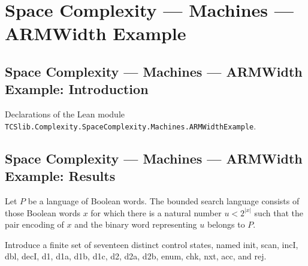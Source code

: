 \section{Space Complexity --- Machines --- ARMWidth Example}
\subsection*{Space Complexity --- Machines --- ARMWidth Example: Introduction}

Declarations of the Lean module \texttt{TCSlib.Complexity.SpaceComplexity.Machines.ARMWidthExample}.

\subsection*{Space Complexity --- Machines --- ARMWidth Example: Results}

\begin{definition}
\label{Complexity.LogProg.WidthExample.searchLang}
\leanok
{}
Let $P$ be a language of Boolean words. The bounded search language consists of those
Boolean words $x$ for which there is a natural number $u<2^{|x|}$ such that the pair
encoding of $x$ and the binary word representing $u$ belongs to $P$.
\end{definition}

\begin{definition}
\label{Complexity.LogProg.WidthExample.Lb}
\leanok
Introduce a finite set of seventeen distinct control states, named init, scan, incI,
dbl, decI, d1, d1a, d1b, d1c, d2, d2a, d2b, enum, chk, nxt, acc, and rej.
\end{definition}

